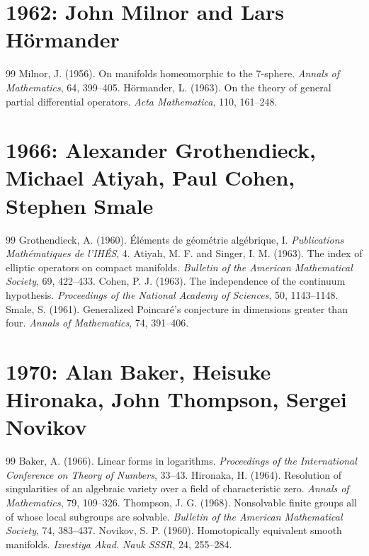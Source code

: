 \documentclass[12pt,a4paper]{book}
\theoremstyle{definition}
\theoremstyle{remark}
\begin{document}
\section*{1962: John Milnor and Lars Hörmander}
\begin{thebibliography}{99}
 Milnor, J. (1956). On manifolds homeomorphic to the 7-sphere. \emph{Annals of Mathematics}, 64, 399--405.
 Hörmander, L. (1963). On the theory of general partial differential operators. \emph{Acta Mathematica}, 110, 161--248.
\end{thebibliography}

\section*{1966: Alexander Grothendieck, Michael Atiyah, Paul Cohen, Stephen Smale}
\begin{thebibliography}{99}
 Grothendieck, A. (1960). Éléments de géométrie algébrique, I. \emph{Publications Mathématiques de l'IHÉS}, 4.
 Atiyah, M. F. and Singer, I. M. (1963). The index of elliptic operators on compact manifolds. \emph{Bulletin of the American Mathematical Society}, 69, 422--433.
 Cohen, P. J. (1963). The independence of the continuum hypothesis. \emph{Proceedings of the National Academy of Sciences}, 50, 1143--1148.
 Smale, S. (1961). Generalized Poincaré's conjecture in dimensions greater than four. \emph{Annals of Mathematics}, 74, 391--406.
\end{thebibliography}

\section*{1970: Alan Baker, Heisuke Hironaka, John Thompson, Sergei Novikov}
\begin{thebibliography}{99}
 Baker, A. (1966). Linear forms in logarithms. \emph{Proceedings of the International Conference on Theory of Numbers}, 33--43.
 Hironaka, H. (1964). Resolution of singularities of an algebraic variety over a field of characteristic zero. \emph{Annals of Mathematics}, 79, 109--326.
 Thompson, J. G. (1968). Nonsolvable finite groups all of whose local subgroups are solvable. \emph{Bulletin of the American Mathematical Society}, 74, 383--437.
 Novikov, S. P. (1960). Homotopically equivalent smooth manifolds. \emph{Izvestiya Akad. Nauk SSSR}, 24, 255--284.
\end{thebibliography}
\end{document}
